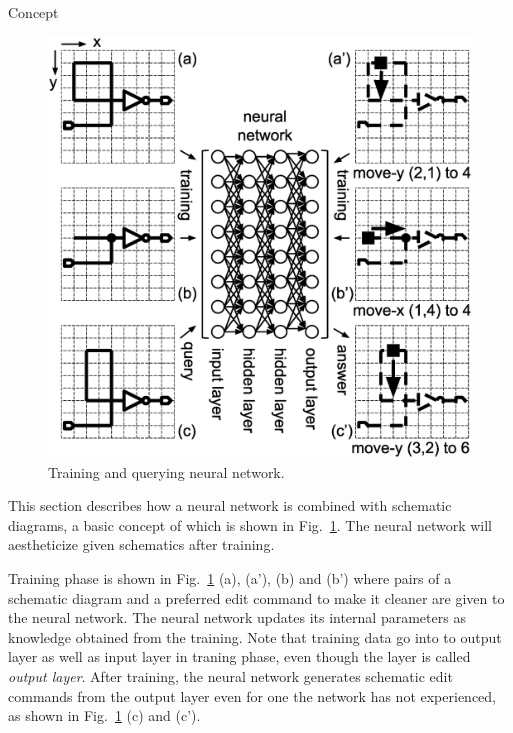\documentclass[twocolumn]{article}
\makeatletter
\def\section{\@startsection {section}{1}{\z@}{20pt plus 2pt minus 2pt}
{8pt plus 2pt minus 2pt}{\centering\normalsize\sc
\edef\@svsec{\thesection.\ }}}
\def\thesection{\Roman{section}}
\makeatother
\begin{document}
\section{Concept}

\begin{figure}[!tp]
 \begin{center}
  \begin{minipage}{\hsize}
   \includegraphics[width=\hsize]{fig/nn_schem_06.eps}
   \caption{Training and querying neural network.}
   \label{fig:nn_schem}
  \end{minipage}
 \end{center}
\end{figure}

This section describes how a neural network is
combined with schematic diagrams,
a basic concept of which is shown in Fig.\ \ref{fig:nn_schem}.
The neural network will aestheticize given schematics after training.

Training phase is shown in Fig.\ \ref{fig:nn_schem} (a), (a'), (b) and (b')
where pairs of a schematic diagram and a preferred edit command
to make it cleaner are given to the neural network.
The neural network updates its internal parameters as knowledge obtained
from the training.
Note that training data go into to output layer
as well as input layer in traning phase,
even though the layer is called {\it output layer}.
After training, the neural network generates schematic edit commands
from the output layer even for one the network has not experienced,
as shown in Fig.\ \ref{fig:nn_schem} (c) and (c').
\end{document}
